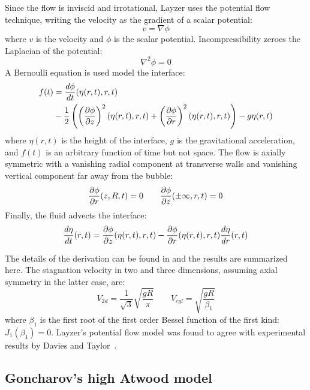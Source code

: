 Since the flow is inviscid and irrotational, Layzer uses the potential flow technique, writing the velocity as the gradient of a scalar potential:
\begin{equation}
v = \nabla \phi
\end{equation}
where 
$v$ is the velocity and 
$\phi$ is the scalar potential.
Incompressibility zeroes the Laplacian of the potential:
\begin{equation}
\nabla^2 \phi = 0
\end{equation}
A Bernoulli equation is used model the interface:
\begin{equation} \label{eqn:LayzerBernoulli}
\begin{aligned}
f(t) & = \frac{d \phi}{d t}(\eta(r,t), r, t) \\
& - \frac{1}{2} \left(\left(\frac{\partial \phi}{\partial z}\right)^2(\eta(r,t), r, t) +\left(\frac{\partial \phi}{\partial r}\right)^2(\eta(r,t), r, t)\right) - g \eta(r,t) 
\end{aligned}
\end{equation}
where 
$\eta(r,t)$ is the height of the interface,
$g$ is the gravitational acceleration, and 
$f(t)$ is an arbitrary function of time but not space.
The flow is axially symmetric with a vanishing radial component at transverse walls and vanishing vertical component far away from the bubble:
\begin{equation}
\frac{\partial \phi}{\partial r}(z,R,t) = 0 \qquad \frac{\partial \phi}{\partial z}(\pm \infty, r, t) = 0
\end{equation}
Finally, the fluid advects the interface:
\begin{equation}
\frac{d \eta}{d t}(r,t) = \frac{\partial \phi}{\partial z}(\eta(r,t), r, t) - \frac{\partial \phi}{\partial r}(\eta(r,t), r, t) \frac{d \eta}{d r}(r,t)
\end{equation}

The details of the derivation can be found in  and the results are summarized here.
The stagnation velocity in two and three dimensions, assuming axial symmetry in the latter case, are:
\begin{equation}
V_{2d} = \frac{1}{\sqrt{3}} \sqrt{\frac{g R}{\pi}}  \qquad V_{cyl} = \sqrt{\frac{g R}{\beta_1}} 
\end{equation}
where $\beta_1$ is the first root of the first order Bessel function of the first kind: $J_{1}(\beta_1) = 0$.
Layzer's potential flow model was found to agree with experimental results by Davies and Taylor~\cite{Davies1950a}.

\subsection{Goncharov's high Atwood model}

